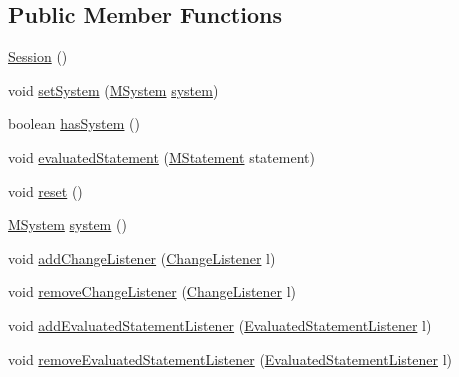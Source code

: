 \subsection*{Public Member Functions}
\begin{DoxyCompactItemize}
\item 
\hyperlink{classorg_1_1tzi_1_1use_1_1main_1_1_session_a20896cc8ce7179ee5293b197c06973be}{Session} ()
\item 
void \hyperlink{classorg_1_1tzi_1_1use_1_1main_1_1_session_a25707760da661d72d35150432cf615fb}{set\-System} (\hyperlink{classorg_1_1tzi_1_1use_1_1uml_1_1sys_1_1_m_system}{M\-System} \hyperlink{classorg_1_1tzi_1_1use_1_1main_1_1_session_af680aa872e2a12170d4eccea79bfc0df}{system})
\item 
boolean \hyperlink{classorg_1_1tzi_1_1use_1_1main_1_1_session_a938f935d0e0d22014bf5d570c94d8f61}{has\-System} ()
\item 
void \hyperlink{classorg_1_1tzi_1_1use_1_1main_1_1_session_a78931e5af47aeaaf2096b38c87b1e3d8}{evaluated\-Statement} (\hyperlink{classorg_1_1tzi_1_1use_1_1uml_1_1sys_1_1soil_1_1_m_statement}{M\-Statement} statement)
\item 
void \hyperlink{classorg_1_1tzi_1_1use_1_1main_1_1_session_a2d66dd72e9ed80c3f9fac1e84a625b83}{reset} ()
\item 
\hyperlink{classorg_1_1tzi_1_1use_1_1uml_1_1sys_1_1_m_system}{M\-System} \hyperlink{classorg_1_1tzi_1_1use_1_1main_1_1_session_af680aa872e2a12170d4eccea79bfc0df}{system} ()
\item 
void \hyperlink{classorg_1_1tzi_1_1use_1_1main_1_1_session_a45d4419436d9f0641368702e36d71505}{add\-Change\-Listener} (\hyperlink{interfaceorg_1_1tzi_1_1use_1_1main_1_1_change_listener}{Change\-Listener} l)
\item 
void \hyperlink{classorg_1_1tzi_1_1use_1_1main_1_1_session_aa38e0682bf319e979572a385802a3a95}{remove\-Change\-Listener} (\hyperlink{interfaceorg_1_1tzi_1_1use_1_1main_1_1_change_listener}{Change\-Listener} l)
\item 
void \hyperlink{classorg_1_1tzi_1_1use_1_1main_1_1_session_a1c099f7be9c60053033d2508b09479df}{add\-Evaluated\-Statement\-Listener} (\hyperlink{interfaceorg_1_1tzi_1_1use_1_1main_1_1_session_1_1_evaluated_statement_listener}{Evaluated\-Statement\-Listener} l)
\item 
void \hyperlink{classorg_1_1tzi_1_1use_1_1main_1_1_session_a15cbfa2a5b475565870e64d79542d1fe}{remove\-Evaluated\-Statement\-Listener} (\hyperlink{interfaceorg_1_1tzi_1_1use_1_1main_1_1_session_1_1_evaluated_statement_listener}{Evaluated\-Statement\-Listener} l)
\end{DoxyCompactItemize}


